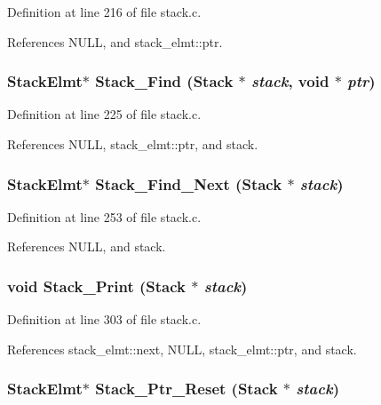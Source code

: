 Definition at line 216 of file stack.c.

References NULL, and stack\_\-elmt::ptr.
\subsubsection{\setlength{\rightskip}{0pt plus 5cm}\bf{Stack\-Elmt}$\ast$ Stack\_\-Find (\bf{Stack} $\ast$ {\em stack}, void $\ast$ {\em ptr})}\label{stack_8h_417303f375efe00595817d5baebb7ffa}




Definition at line 225 of file stack.c.

References NULL, stack\_\-elmt::ptr, and stack.
\subsubsection{\setlength{\rightskip}{0pt plus 5cm}\bf{Stack\-Elmt}$\ast$ Stack\_\-Find\_\-Next (\bf{Stack} $\ast$ {\em stack})}\label{stack_8h_ff8a51625133db1301411bce55048f97}




Definition at line 253 of file stack.c.

References NULL, and stack.
\subsubsection{\setlength{\rightskip}{0pt plus 5cm}void Stack\_\-Print (\bf{Stack} $\ast$ {\em stack})}\label{stack_8h_5e4010a7a8c631ff5d602f6c78d65828}




Definition at line 303 of file stack.c.

References stack\_\-elmt::next, NULL, stack\_\-elmt::ptr, and stack.
\subsubsection{\setlength{\rightskip}{0pt plus 5cm}\bf{Stack\-Elmt}$\ast$ Stack\_\-Ptr\_\-Reset (\bf{Stack} $\ast$ {\em stack})}\label{stack_8h_9f54527c882b81a04f60705b652e2375}




